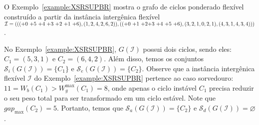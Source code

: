 O Exemplo~\ref{example:XSRSUPBR} mostra o grafo de ciclos ponderado flexível construído a partir da instância intergênica flexível $\mathcal{I} = ((({+0}~{+5}~{+4}~{+3}~{+2}~{+1}~{+6}),(1,2,4,2,6,2)),(({+0}~{+1}~{+2}\break{+3}~{+4}~{+5}~{+6}),(3,2,1,0,2,1),(4,3,1,4,3,4)))$.



No Exemplo~\ref{example:XSRSUPBR}, $G(\mathcal{I})$ possui dois ciclos, sendo eles: $C_1 = (5,3,1)$ e $C_2 = (6,4,2)$. Além disso, temos os conjuntos $\mathcal{S}_i(G(\mathcal{I})) = \{C_1\}$ e $\mathcal{S}_e(G(\mathcal{I})) = \{C_2\}$. Observe que a instância intergênica flexível $\mathcal{I}$ do Exemplo~\ref{example:XSRSUPBR} pertence ao caso sorvedouro: $11 = W_b(C_1) > W^{\max}_g(C_1) = 8$, onde apenas o ciclo instável $C_1$ precisa reduzir o seu peso total para ser transformado em um ciclo estável. Note que $gap_{\max}(C_2) = 5$. Portanto, temos que $\mathcal{S}_a(G(\mathcal{I})) = \{C_2\}$ e $\mathcal{S}_d(G(\mathcal{I})) = \varnothing$.